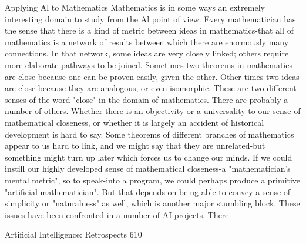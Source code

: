 {                            Applying Al to Mathematics
Mathematics is in some ways an extremely interesting domain to study from the Al point
of view. Every mathematician has the sense that there is a kind of metric between ideas in
mathematics-that all of mathematics is a network of results between which there are
enormously many connections. In that network, some ideas are very closely linked;
others require more elaborate pathways to be joined. Sometimes two theorems in
mathematics are close because one can be proven easily, given the other. Other times two
ideas are close because they are analogous, or even isomorphic. These are two different
senses of the word "close" in the domain of mathematics. There are probably a number of
others. Whether there is an objectivity or a universality to our sense of mathematical
closeness, or whether it is largely an accident of historical development is hard to say.
Some theorems of different branches of mathematics appear to us hard to link, and we
might say that they are unrelated-but something might turn up later which forces us to
change our minds. If we could instill our highly developed sense of mathematical
closeness-a "mathematician's mental metric", so to speak-into a program, we could
perhaps produce a primitive "artificial mathematician". But that depends on being able to
convey a sense of simplicity or "naturalness" as well, which is another major stumbling
block.
        These issues have been confronted in a number of AI projects. There




Artificial Intelligence: Retrospects                                                  610

}
